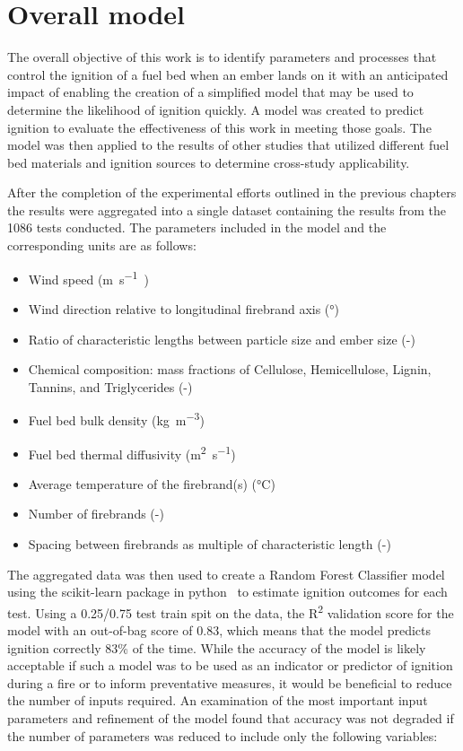 \section{Overall model}
    The overall objective of this work is to identify parameters and processes that control the ignition of a fuel bed when an ember lands on it with an anticipated impact of enabling the creation of a simplified model that may be used to determine the likelihood of ignition quickly. A model was created to predict ignition to evaluate the effectiveness of this work in meeting those goals. The model was then applied to the results of other studies that utilized different fuel bed materials and ignition sources to determine cross-study applicability.
    
    After the completion of the experimental efforts outlined in the previous chapters the results were aggregated into a single dataset containing the results from the 1086 tests conducted. The parameters included in the model and the corresponding units are as follows:
        \begin{itemize}
            \item Wind speed (\si{\meter\per\second)}
            \item Wind direction relative to longitudinal firebrand axis (\si{\degree})
            \item Ratio of characteristic lengths between particle size and ember size (-)
            \item Chemical composition: mass fractions of Cellulose, Hemicellulose, Lignin, Tannins, and Triglycerides (-)
            \item Fuel bed bulk density (\si{\kilo\gram\per\cubic\meter})
            \item Fuel bed thermal diffusivity (\si{\square\meter\per\second})
            \item Average temperature of the firebrand(s) (\si{\celsius})
            \item Number of firebrands (-)
            \item Spacing between firebrands as multiple of characteristic length (-)
        \end{itemize}
    The aggregated data was then used to create a Random Forest Classifier model using the scikit-learn package in python~\cite{scikit-learn} to estimate ignition outcomes for each test. Using a 0.25/0.75 test train spit on the data, the R\textsuperscript{2} validation score for the model with an out-of-bag score of 0.83, which means that the model predicts ignition correctly 83\% of the time. While the accuracy of the model is likely acceptable if such a model was to be used as an indicator or predictor of ignition during a fire or to inform preventative measures, it would be beneficial to reduce the number of inputs required. An examination of the most important input parameters and refinement of the model found that accuracy was not degraded if the number of parameters was reduced to include only the following variables:
